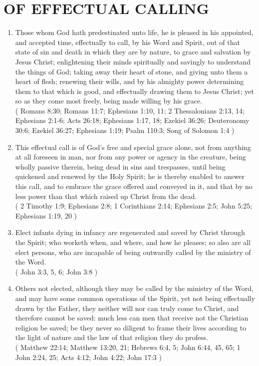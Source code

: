 \documentclass[12pt,a4paper]{book}
\begin{document}
\chapter{OF EFFECTUAL CALLING}
\label{ch-eff-cal}
\begin{enumerate}
\item
\label{ch-eff-cal-1}
Those whom God hath predestinated unto life, he is pleased in his appointed, and accepted time, effectually to call, by his Word and Spirit, out of that state of sin and death in which they are by nature, to grace and salvation by Jesus Christ; enlightening their minds spiritually and savingly to understand the things of God; taking away their heart of stone, and giving unto them a heart of flesh; renewing their wills, and by his almighty power determining them to that which is good, and effectually drawing them to Jesus Christ; yet so as they come most freely, being made willing by his grace.\\
( Romans 8:30; Romans 11:7; Ephesians 1:10, 11; 2 Thessalonians 2:13, 14; Ephesians 2:1-6; Acts 26:18; Ephesians 1:17, 18; Ezekiel 36:26; Deuteronomy 30:6; Ezekiel 36:27; Ephesians 1:19; Psalm 110:3; Song of Solomon 1:4 )
\item
\label{ch-eff-cal-2}
This effectual call is of God's free and special grace alone, not from anything at all foreseen in man, nor from any power or agency in the creature, being wholly passive therein, being dead in sins and trespasses, until being quickened and renewed by the Holy Spirit; he is thereby enabled to answer this call, and to embrace the grace offered and conveyed in it, and that by no less power than that which raised up Christ from the dead.\\
( 2 Timothy 1:9; Ephesians 2:8; 1 Corinthians 2:14; Ephesians 2:5; John 5:25; Ephesians 1:19, 20 )
\item
\label{ch-eff-cal-3}
Elect infants dying in infancy are regenerated and saved by Christ through the Spirit; who worketh when, and where, and how he pleases; so also are all elect persons, who are incapable of being outwardly called by the ministry of the Word.\\
( John 3:3, 5, 6; John 3:8 )
\item
\label{ch-eff-cal-4}
Others not elected, although they may be called by the ministry of the Word, and may have some common operations of the Spirit, yet not being effectually drawn by the Father, they neither will nor can truly come to Christ, and therefore cannot be saved: much less can men that receive not the Christian religion be saved; be they never so diligent to frame their lives according to the light of nature and the law of that religion they do profess.\\
( Matthew 22:14; Matthew 13:20, 21; Hebrews 6:4, 5; John 6:44, 45, 65; 1 John 2:24, 25; Acts 4:12; John 4:22; John 17:3 )
\end{enumerate}
\end{document}
